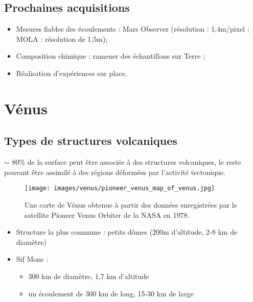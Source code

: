 \documentclass[10pt,a4paper, twocolumns]{article}
\begin{document}
\subsection{Prochaines acquisitions}

	\begin{itemize}
		\item Mesures fiables des écoulements : Mars Observer (résolution : 1,4m/pixel ;\\MOLA : résolution de 1,5m);
		\item Composition chimique : ramener des échantillons sur Terre ;
		\item Réalisation d'expériences sur place.
	\end{itemize}

\section{Vénus}

	\subsection{Types de structures volcaniques}
	
	$\sim$ 80\% de la surface peut être associée à des structures volcaniques, le reste pouvant être assimilé à des régions déformées par l'activité tectonique.
	
	\begin{figure}[!h]
		\centering
		\texttt{[image: images/venus/pioneer\_venus\_map\_of\_venus.jpg]} 
		\caption{Une carte de Vénus obtenue à partir des données enregistrées par le satellite Pioneer Venus Orbiter de la NASA en 1978.}
	\end{figure}
	
	\begin{itemize}
		\item Structure la plus commune : petits dômes (200m d'altitude, 2-8 km de diamètre)
		\item Sif Mons :
		\begin{itemize}
			\item 300 km de diamètre, 1,7 km d'altitude
			\item un écoulement de 300 km de long, 15-30 km de large
		\end{itemize}
	\end{itemize}
	
\end{document}
